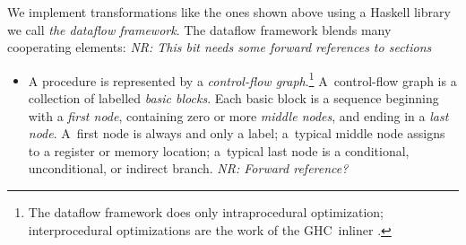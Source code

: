 \documentclass[blockstyle,preprint,nocopyrightspace]{sigplanconf}
\let\cite\citep
\newcommand{\authornote}[1]{{\em #1}}
\newcommand{\norman}[1]{\authornote{NR: #1}}
\let\remark\norman
\begin{document}
We implement transformations like the ones shown above using a Haskell
library we call \emph{the dataflow framework}.
The dataflow framework blends many cooperating elements:
\remark{This bit needs some forward references to sections}
\begin{itemize}
\item 
A procedure is represented by a \emph{control-flow graph}.\footnote
{The dataflow framework does only intraprocedural optimization;
interprocedural optimizations are the work of the GHC~inliner
\cite{peyton-jones:secrets-inliner}.} 
A~control-flow graph is a collection of labelled \emph{basic blocks}.
Each basic block is a sequence beginning with a \emph{first node},
containing zero or more \emph{middle nodes},
and ending in a \emph{last node}.
A~first node is always and only a label;
a~typical middle node assigns to a register or memory location;
a~typical last node is a conditional, unconditional, or indirect branch.
\remark{Forward reference?}


\end{itemize}
\end{document}
